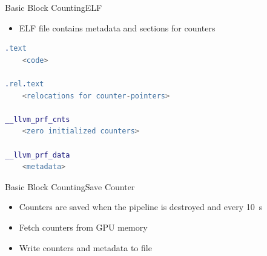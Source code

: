 \documentclass[xcolor={usenames,dvipsnames}, aspectratio=169, 12pt]{beamer}
\begin{document}
\begin{frame}[fragile]{Basic Block Counting}{ELF}
\begin{itemize}
	\item ELF file contains metadata and sections for counters
\end{itemize}

\begin{lstlisting}[language=erlang]
.text
	<code>

.rel.text
	<relocations for counter-pointers>

__llvm_prf_cnts
	<zero initialized counters>

__llvm_prf_data
	<metadata>
\end{lstlisting}
\end{frame}
\framelogo{}

{
\begin{frame}{Basic Block Counting}{Save Counter}
\begin{itemize}
	\item Counters are saved when the pipeline is destroyed and every \SI{10}{\second}
	\item Fetch counters from GPU memory
	\item Write counters and metadata to file
\end{itemize}
\end{frame}}
\end{document}
